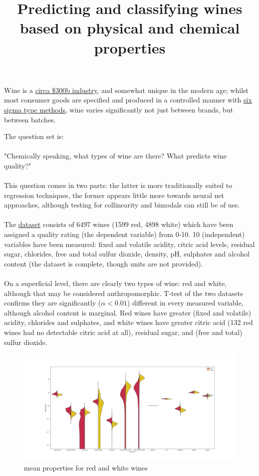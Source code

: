 \documentclass{article}
\begin{document}
\title{Predicting and classifying wines based on physical and chemical properties}
\maketitle
\begin{flushleft}
Wine is a \href{https://www.zionmarketresearch.com/report/wine-market}{circa \$300b industry}, and somewhat unique in the modern age; whilst most consumer goods are 
specified and produced in a controlled manner with \href{https://www.isixsigma.com/new-to-six-sigma/what-six-sigma/}{six sigma type methods}, 
wine varies significantly not just between brands, 
but between batches. 
\end{flushleft}
The question set is:
\\~\\
"Chemically speaking, what types of wine are there? What predicts wine quality?"
\\~\\
This question comes in two parts: the latter is more traditionally suited to regression techniques, 
the former appears little more towards neural net approaches, although testing for collinearity and bimodals
can still be of use.
\\~\\
The \href{http://archive.ics.uci.edu/ml/machine-learning-databases/wine-quality/}{dataset} consists of 6497 wines (1599 red, 4898 white) which have been assigned a quality rating (the dependent variable) from 0-10.  
10 (independent) variables have been measured: fixed and volatile acidity, citric acid levels, residual sugar, chlorides, free and total sulfur dioxide,
density, pH, sulphates and alcohol content (the dataset is complete, though units are not provided). 
\\~\\
On a superficial level, there are clearly two types of wine: red and white, although that may be considered anthropomorphic.  T-test of the two datasets
confirms they are significantly ($\alpha < 0.01$) different in every measured variable, although alcohol content is marginal. Red wines have greater (fixed and volatile) acidity, chlorides and sulphates, and white wines have greater citric acid (132 red wines had no detectable citric acid at all), 
residual sugar, and (free and total) sulfur dioxide.

\begin{figure}[h]
\includegraphics[width=\linewidth]{figures/red_white_properties_log_axis.png}
\caption{mean properties for red and white wines}
\label{fig:means}
\end{figure}
\end{document}
